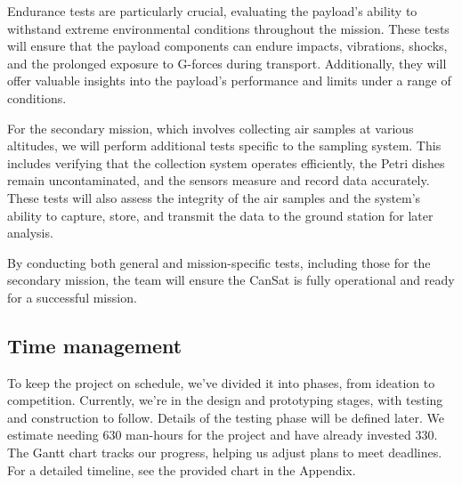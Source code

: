 Endurance tests are particularly crucial, evaluating the payload’s ability to withstand extreme environmental conditions throughout the mission. These tests will ensure that the payload components can endure impacts, vibrations, shocks, and the prolonged exposure to G-forces during transport. Additionally, they will offer valuable insights into the payload's performance and limits under a range of conditions.

For the secondary mission, which involves collecting air samples at various altitudes, we will perform additional tests specific to the sampling system. This includes verifying that the collection system operates efficiently, the Petri dishes remain uncontaminated, and the sensors measure and record data accurately. These tests will also assess the integrity of the air samples and the system's ability to capture, store, and transmit the data to the ground station for later analysis.

By conducting both general and mission-specific tests, including those for the secondary mission, the team will ensure the CanSat is fully operational and ready for a successful mission.


\subsection{Time management}
To keep the project on schedule, we've divided it into phases, from ideation to competition. Currently, we're in the design and prototyping stages, with testing and construction to follow. Details of the testing phase will be defined later. We estimate needing 630 man-hours for the project and have already invested 330. The Gantt chart tracks our progress, helping us adjust plans to meet deadlines. For a detailed timeline, see the provided chart in the Appendix. 

